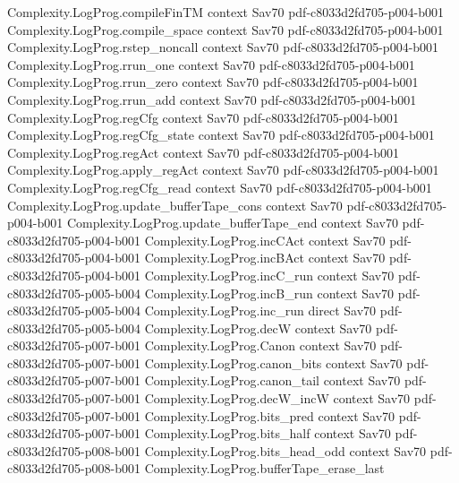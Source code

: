 \begin{theorem}
\proofstep
  {Complexity.LogProg.compileFinTM}
  {context}
  {Sav70}
  {pdf-c8033d2fd705-p004-b001}
\proofstep
  {Complexity.LogProg.compile_space}
  {context}
  {Sav70}
  {pdf-c8033d2fd705-p004-b001}
\proofstep
  {Complexity.LogProg.rstep_noncall}
  {context}
  {Sav70}
  {pdf-c8033d2fd705-p004-b001}
\proofstep
  {Complexity.LogProg.rrun_one}
  {context}
  {Sav70}
  {pdf-c8033d2fd705-p004-b001}
\proofstep
  {Complexity.LogProg.rrun_zero}
  {context}
  {Sav70}
  {pdf-c8033d2fd705-p004-b001}
\proofstep
  {Complexity.LogProg.rrun_add}
  {context}
  {Sav70}
  {pdf-c8033d2fd705-p004-b001}
\proofstep
  {Complexity.LogProg.regCfg}
  {context}
  {Sav70}
  {pdf-c8033d2fd705-p004-b001}
\proofstep
  {Complexity.LogProg.regCfg_state}
  {context}
  {Sav70}
  {pdf-c8033d2fd705-p004-b001}
\proofstep
  {Complexity.LogProg.regAct}
  {context}
  {Sav70}
  {pdf-c8033d2fd705-p004-b001}
\proofstep
  {Complexity.LogProg.apply_regAct}
  {context}
  {Sav70}
  {pdf-c8033d2fd705-p004-b001}
\proofstep
  {Complexity.LogProg.regCfg_read}
  {context}
  {Sav70}
  {pdf-c8033d2fd705-p004-b001}
\proofstep
  {Complexity.LogProg.update_bufferTape_cons}
  {context}
  {Sav70}
  {pdf-c8033d2fd705-p004-b001}
\proofstep
  {Complexity.LogProg.update_bufferTape_end}
  {context}
  {Sav70}
  {pdf-c8033d2fd705-p004-b001}
\proofstep
  {Complexity.LogProg.incCAct}
  {context}
  {Sav70}
  {pdf-c8033d2fd705-p004-b001}
\proofstep
  {Complexity.LogProg.incBAct}
  {context}
  {Sav70}
  {pdf-c8033d2fd705-p004-b001}
\proofstep
  {Complexity.LogProg.incC_run}
  {context}
  {Sav70}
  {pdf-c8033d2fd705-p005-b004}
\proofstep
  {Complexity.LogProg.incB_run}
  {context}
  {Sav70}
  {pdf-c8033d2fd705-p005-b004}
\proofstep
  {Complexity.LogProg.inc_run}
  {direct}
  {Sav70}
  {pdf-c8033d2fd705-p005-b004}
\proofstep
  {Complexity.LogProg.decW}
  {context}
  {Sav70}
  {pdf-c8033d2fd705-p007-b001}
\proofstep
  {Complexity.LogProg.Canon}
  {context}
  {Sav70}
  {pdf-c8033d2fd705-p007-b001}
\proofstep
  {Complexity.LogProg.canon_bits}
  {context}
  {Sav70}
  {pdf-c8033d2fd705-p007-b001}
\proofstep
  {Complexity.LogProg.canon_tail}
  {context}
  {Sav70}
  {pdf-c8033d2fd705-p007-b001}
\proofstep
  {Complexity.LogProg.decW_incW}
  {context}
  {Sav70}
  {pdf-c8033d2fd705-p007-b001}
\proofstep
  {Complexity.LogProg.bits_pred}
  {context}
  {Sav70}
  {pdf-c8033d2fd705-p007-b001}
\proofstep
  {Complexity.LogProg.bits_half}
  {context}
  {Sav70}
  {pdf-c8033d2fd705-p008-b001}
\proofstep
  {Complexity.LogProg.bits_head_odd}
  {context}
  {Sav70}
  {pdf-c8033d2fd705-p008-b001}
\proofstep
  {Complexity.LogProg.bufferTape_erase_last}

\end{theorem}
